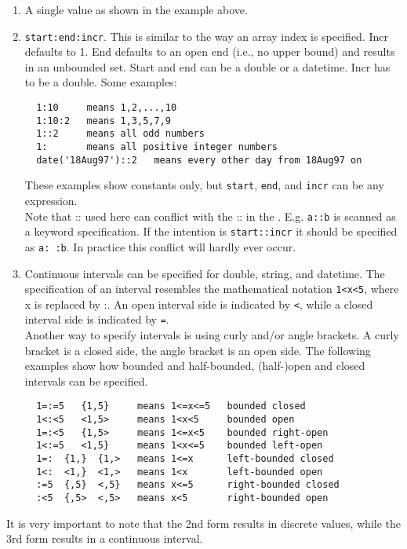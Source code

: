 \begin{enumerate}
\item A single value as shown in the example above.
\item \texttt{start:end:incr}. This is similar to the
way an array index is specified. Incr defaults to 1.
End defaults to an open end (i.e., no upper bound) and results
in an unbounded set. Start and end can be a double or a datetime.
Incr has to be a double. Some examples:
\begin{verbatim}
  1:10     means 1,2,...,10
  1:10:2   means 1,3,5,7,9
  1::2     means all odd numbers
  1:       means all positive integer numbers
  date('18Aug97')::2   means every other day from 18Aug97 on
\end{verbatim}
These examples show constants only, but \texttt{start}, \texttt{end},
and \texttt{incr} can be any expression.
\\Note that :: used here can conflict with the :: in the
. E.g. \texttt{a::b} is scanned as
a keyword specification. If the intention is \texttt{start::incr}
it should be specified as \texttt{a: :b}. In practice this conflict
will hardly ever occur.
\item Continuous intervals can be specified for double, string, and datetime.
The specification of an interval resembles the mathematical notation
\texttt{1<x<5}, where x is replaced by :. An open interval side
is indicated by \texttt{<}, while a closed interval side is indicated
by \texttt{=}.
\\Another way to specify intervals is using curly and/or angle brackets.
A curly bracket is a closed side, the angle bracket is an open side.
The following examples show how bounded and half-bounded,
(half-)open and closed intervals can be specified.
\begin{verbatim}
  1=:=5   {1,5}     means 1<=x<=5   bounded closed
  1<:<5   <1,5>     means 1<x<5     bounded open
  1=:<5   {1,5>     means 1<=x<5    bounded right-open
  1<:=5   <1,5}     means 1<x<=5    bounded left-open
  1=:  {1,}  {1,>   means 1<=x      left-bounded closed
  1<:  <1,}  <1,>   means 1<x       left-bounded open
  :=5  {,5}  <,5}   means x<=5      right-bounded closed
  :<5  {,5>  <,5>   means x<5       right-bounded open
\end{verbatim}
\end{enumerate}
It is very important to note that the 2nd form results in
discrete values, while the 3rd form results in a continuous interval.

